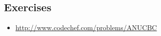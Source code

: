 \subsection{Exercises}
\begin{itemize}
 \item \url{http://www.codechef.com/problems/ANUCBC}
 
\end{itemize}